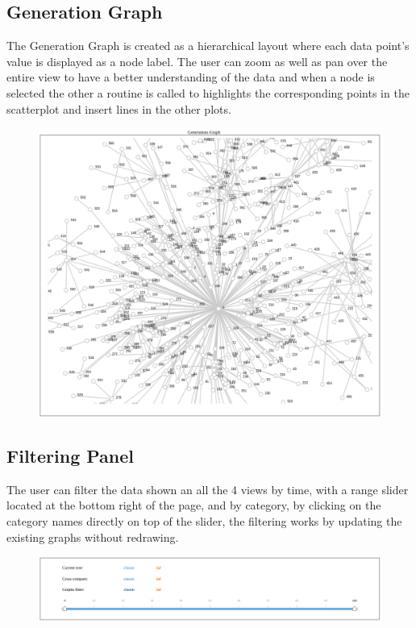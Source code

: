 \documentclass[conference,compsoc]{IEEEtran}
\begin{document}
\subsection{Generation Graph}
The Generation Graph is created as a hierarchical layout where each data point's value is displayed as a node label. The user can zoom as well as pan over the entire view to have a better understanding of the data and when a node is selected the other a routine is called to highlights the corresponding points in the scatterplot and insert lines in the other plots.
\begin{figure}[H]
  \includegraphics[scale=0.2]{img/tree}
  \label{fig:tree}
\end{figure}

\subsection{Filtering Panel}
The user can filter the data shown an all the 4 views by time, with a range slider located at the bottom right of the page, and by category, by clicking on the category names directly on top of the slider, the filtering works by updating the existing graphs without redrawing.
\begin{figure}[H]
  \includegraphics[scale=0.2]{img/panel}
  \label{fig:panel}
\end{figure}
\end{document}

